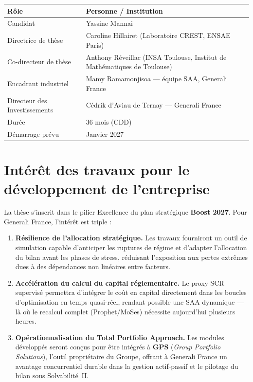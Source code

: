 \documentclass[10pt,a4paper]{article}
\begin{document}
\begin{tabularx}{\textwidth}{@{}lX@{}}
  \toprule
  \textbf{Rôle}                  & \textbf{Personne / Institution} \\
  \midrule
  Candidat                       & Yassine Mannai \\
  Directrice de thèse            & Caroline Hillairet
                                   (Laboratoire CREST, ENSAE Paris) \\
  Co-directeur de thèse          & Anthony Réveillac
                                   (INSA Toulouse,
                                    Institut de Mathématiques de Toulouse) \\
  Encadrant industriel           & Mamy Ramamonjisoa ---
                                   équipe SAA, Generali France \\
  Directeur des Investissements  & Cédrik d'Aviau de Ternay ---
                                   Generali France \\
  Durée                          & 36 mois (CDD) \\
  Démarrage prévu                & Janvier 2027 \\
  \bottomrule
\end{tabularx}

\section{Intérêt des travaux pour le développement de l'entreprise}

La thèse s'inscrit dans le pilier \og{}Excellence\fg{} du plan stratégique
\textbf{Boost 2027}.  Pour Generali France, l'intérêt est triple :

\begin{enumerate}[leftmargin=2em,itemsep=4pt]
  \item \textbf{Résilience de l'allocation stratégique.}
        Les travaux fourniront un outil de simulation capable d'anticiper les
        ruptures de régime et d'adapter l'allocation du bilan avant les phases
        de stress, réduisant l'exposition aux pertes extrêmes dues à des
        dépendances non linéaires entre facteurs.

  \item \textbf{Accélération du calcul du capital réglementaire.}
        Le proxy SCR supervisé permettra d'intégrer le coût en capital
        directement dans les boucles d'optimisation en temps quasi-réel,
        rendant possible une SAA dynamique --- là où le recalcul complet
        (Prophet/MoSes) nécessite aujourd'hui plusieurs heures.

  \item \textbf{Opérationnalisation du Total Portfolio Approach.}
        Les modules développés seront conçus pour être intégrés à \textbf{GPS}
        (\textit{Group Portfolio Solutions}), l'outil propriétaire du Groupe,
        offrant à Generali France un avantage concurrentiel durable dans la
        gestion actif-passif et le pilotage du bilan sous Solvabilité~II.
\end{enumerate}
\end{document}
